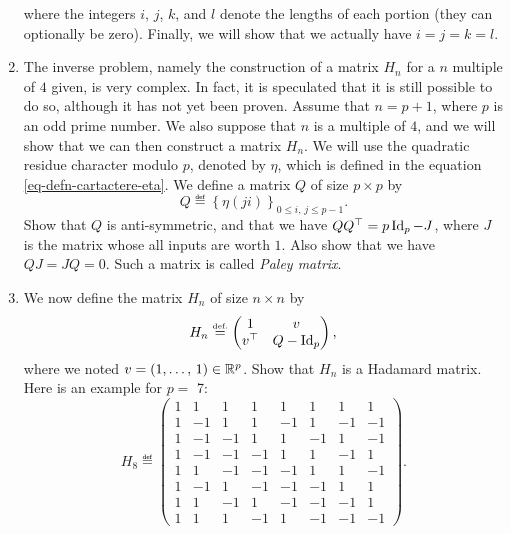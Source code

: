 \begin{exo}
\begin{enumerate}
\begin{equation*}
\end{equation*}
where the integers $ i $, $ j $, $ k $, and $ l $ denote the lengths of each portion (they can optionally be zero). Finally, we will show that we actually have $ i = j = k = l $.
\item {}   The inverse problem, namely the construction of a matrix $ H_n $ for a $ n $ multiple of $ 4 $ given, is very complex. In fact, it is speculated that it is still possible to do so, although it has not yet been proven. Assume that $ n = p + 1 $, where $ p $ is an odd prime number. We also suppose that $ n $ is a multiple of $ 4 $, and we will show that we can then construct a matrix $ H_n $. We will use the quadratic residue character modulo $ p $, denoted by $ \eta $, which is defined in the equation \eqref{eq-defn-cartactere-eta}. We define a matrix $ Q $ of size $ p \times p $ by
\begin{equation*}
Q \eqdef \left\{\eta (ji) \right\}_{0 \leq i, \, j \leq p-1}.
\end{equation*}
Show that $ Q $ is anti-symmetric, and that we have $ Q Q^\top = p \operatorname{Id}_p - J $, where $ J $ is the matrix whose all inputs are worth $ 1 $. Also show that we have $ QJ = JQ = 0 $. Such a matrix is called \textit{Paley matrix}.
\item We now define the matrix $ H_n $ of size $ n \times n $ by
\begin{equation*}
H_n \stackrel{\mbox{\upshape\tiny def.}}{=} \begin{pmatrix} 1 & v \\v^\top & Q- \operatorname{Id}_p \end{pmatrix},
\end{equation*}
where we noted $ v = (1, \ldots, \, 1) \in \mathbb{R}^p $. Show that $ H_n $ is a Hadamard matrix. Here is an example for $ p = $ 7:
\begin{equation*}
H_8 \eqdef \begin{pmatrix} 1 & 1 & 1 & 1 & 1 & 1 & 1 & 1 \\1 & -1 & 1 & 1 & -1 & 1 & -1 & -1 \\1 & -1 & -1 & 1 & 1 & -1 & 1 & -1 \\1 & -1 & -1 & -1 & 1 & 1 & -1 & 1 \\1 & 1 & -1 & -1 & -1 & 1 & 1 & -1 \\1 & -1 & 1 & -1 & -1 & -1 & 1 & 1 \\1 & 1 & -1 & 1 & -1 & -1 & -1 & 1 \\1 & 1 & 1 & -1 & 1 & -1 & -1 & -1 \end{pmatrix}.
\end{equation*}
 

\end{enumerate}
\end{exo}
